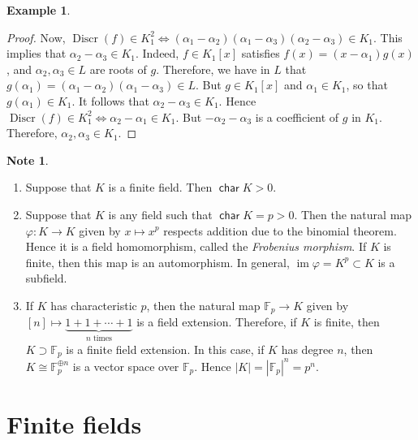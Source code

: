 \documentclass[10pt,letterpaper,cm]{nupset}
\theoremstyle{definition}
\newtheorem{exmp}[definition]{Example}
\newtheorem{note}[definition]{Note}
\theoremstyle{theorem}
\theoremstyle{remark}
\newcommand{\F}{\mathbb F}
\newcommand{\1}{\mathbf{1}}
\newcommand{\0}{\vec 0}
\DeclareMathOperator{\Char}{\mathsf{char}}
\DeclareMathOperator{\im}{im}
\DeclareMathOperator{\disc}{Discr}
\begin{document}
\begin{exmp}
\begin{proof}
\medskip


Now, $\disc(f) \in K_1^2 \iff (\alpha_1 - \alpha_2) ( \alpha_1 - \alpha_3)(\alpha_2 - \alpha_3) \in K_1$. This implies that $\alpha_2 - \alpha_3 \in K_1$. Indeed, $f\in K_1[x]$ satisfies $f(x) = (x-\alpha_1)g(x)$, and $\alpha_2, \alpha_3 \in L$ are roots of $g$. Therefore, we have in $L$ that $g(\alpha_1) = (\alpha_1 - \alpha_2)(\alpha_1 - \alpha_3) \in L$. But $g\in K_1[x]$ and $\alpha_1 \in K_1$, so that $g(\alpha_1) \in K_1$. It follows that $\alpha_2 - \alpha_3 \in K_1$. Hence $\disc(f) \in K_1^2 \iff \alpha_2 - \alpha_1 \in K_1$. But $-\alpha_2 -\alpha_3$ is a coefficient of $g$ in $K_1$. Therefore, $\alpha_2, \alpha_3 \in K_1$. 
\end{proof}
\end{exmp}

\begin{note} $ $
\begin{enumerate}
\item Suppose that $K$ is a finite field. Then $\Char{K}>0$. 
\item Suppose that $K$ is any field such that $\Char{K} = p>0$. Then the natural map $\varphi : K \to K$ given by $x \mapsto x^p$ respects addition due to the binomial theorem. Hence it is a field homomorphism, called the \textit{Frobenius morphism}. If $K$ is finite, then this map is an automorphism. In general, $\im{\varphi} =K^p \subset K$ is a subfield. 
\item If $K$ has characteristic $p$, then the natural map $\F_p \to K$ given by $[n] \mapsto \underbrace{1 + 1 +\cdots +1}_{n \text{ times}}$ is a field extension. Therefore, if $K$ is finite, then $K\supset \F_p$ is a finite field extension. In this case, if $K$ has degree $n$, then $K \cong  \F_p^{\oplus n}$ is a vector space over $\F_p$. Hence $|K| = |\F_p|^n = p^n$. 
\end{enumerate}
\end{note}

\section{Finite fields}
\end{document}
